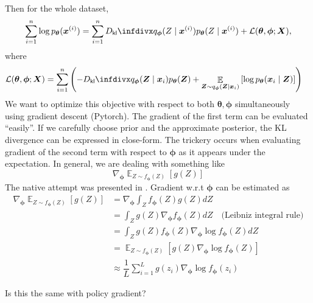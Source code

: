 \documentclass[11pt,a4paper]{article}
\begin{document}
Then for the whole dataset, 
\[
\sum^{n}_{i=1} \log p_{\boldsymbol \theta}(\bm{x}^{(i)}) = 
\sum^{n}_{i=1} \Dkl{q_{\boldsymbol \phi}(Z \mid \bm{x}^{(i)})}{p_{\boldsymbol \theta}(Z \mid \bm{x}^{(i)})}
+ \mathcal{L}(\boldsymbol \theta, \boldsymbol \phi; \bm{X}),
\] 
where 
\begin{align*}
\mathcal{L}(\boldsymbol \theta, \boldsymbol \phi; \bm{X}) 
&= \sum^{n}_{i=1} \left(  - \Dkl{q_{\boldsymbol \phi}(\bm{Z} \mid \bm{x}_{i})}{p_{\boldsymbol \theta}(\bm{Z})} + \mathop{\mathbb{E}}_{\bm{Z} \sim q_{\boldsymbol \phi}(\bm{Z} \mid \bm{x}_{i})} \left[ \log p_{\boldsymbol \theta}(\bm{x}_i \mid \bm{Z}) \right]\right)
\end{align*} 
We want to optimize this objective with respect to both $\boldsymbol \theta, \boldsymbol \phi$ simultaneously using gradient descent (Pytorch).
The gradient of the first term can be evaluated ``easily''. If we carefully choose prior and the approximate posterior, the KL divergence can be expressed in close-form.
The trickery occurs when evaluating gradient of the second term with respect to $\boldsymbol \phi$ as it appears under the expectation. In general, we are dealing with something like
\[
\nabla_{\boldsymbol \phi} \mathop{\mathbb{E}}_{Z \sim f_{\boldsymbol \phi}(Z)}  [g(Z)]
\] 
The native attempt was presented in \cite{paisley2012variational}.
Gradient w.r.t $\boldsymbol \phi$ can be estimated as
\begin{align*}
\nabla_{\boldsymbol \phi} \mathop{\mathbb{E}}_{Z \sim f_{\boldsymbol \phi}(Z)}  [g(Z)]
&= \nabla_{\boldsymbol \phi} \int_{Z} f_{\boldsymbol \phi}(Z) g(Z) dZ \\
&= \int_{Z} g(Z)\nabla_{\boldsymbol \phi} f_{\boldsymbol \phi}(Z)  dZ \quad \text{(Leibniz integral rule)}\\
&= \int_{Z} g(Z) f_{\boldsymbol \phi}(Z) \nabla_{\boldsymbol \phi} \log f_{\boldsymbol \phi}(Z) dZ \\
&= \mathop{\mathbb{E}}_{Z \sim f_{\boldsymbol \phi}(Z)} \left[   g(Z) \nabla_{\boldsymbol \phi} \log f_{\boldsymbol \phi}(Z) \right]\\
&\approx \dfrac{1}{L} \sum^{L}_{i=1} g(z_i) \nabla_{\boldsymbol \phi} \log f_{\boldsymbol \phi}(z_i)
\end{align*} 

{\blue Is this the same with policy gradient?}
\end{document}
